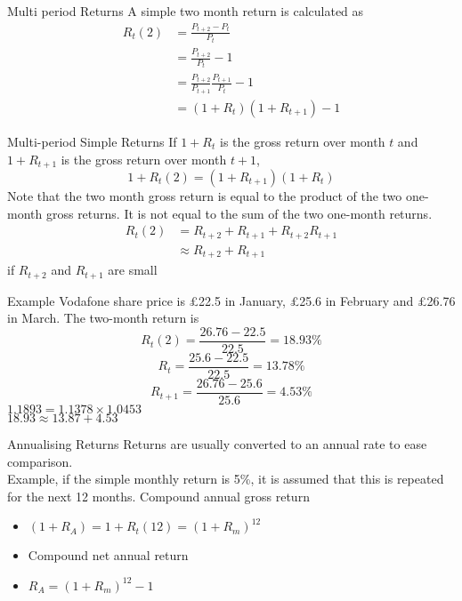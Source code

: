 \documentclass[14pt,xcolor=pdftex,dvipsnames,table]{beamer}
\begin{document}
\begin{frame}{Multi period Returns}
A simple two month return is calculated as 
\begin{align*}
R_t(2) & =\frac{P_{t+2}-P_t}{P_t}\\
&= \frac{P_{t+2}}{P_t} -1\\
& = \frac{P_{t+2}}{P_{t+1}}\frac{P_{t+1}}{P_t} -1\\
&= (1+R_t)(1+R_{t+1})-1
\end{align*}
\end{frame}

\begin{frame}{Multi-period Simple Returns}
If $1+R_t$ is the gross return over month $t$ and $1+R_{t+1}$ is the gross return over month $t+1$, 
\begin{equation}
1+R_t(2) = (1+R_{t+1})(1+R_t)
\end{equation}
Note that the two month gross return is equal to the product of the two one-month gross returns.  It is not equal to the sum of the two one-month returns. 
\begin{align*}
R_t(2) &= R_{t+2}+R_{t+1}+R_{t+2}R_{t+1}\\
& \approx R_{t+2}+R_{t+1}
\end{align*}
if $R_{t+2}$ and $R_{t+1}$ are small 
\end{frame}

\begin{frame}{Example}
Vodafone share price is £22.5 in January, £25.6 in February and £26.76 in March. The two-month return is 
\begin{equation}
R_t(2) = \frac{26.76-22.5}{22.5} = 18.93\%
\end{equation}
\begin{equation}
R_t=\frac{25.6-22.5}{22.5} = 13.78\%
\end{equation}
\begin{equation}
R_{t+1}=\frac{26.76-25.6}{25.6} = 4.53\%
\end{equation}
$1.1893 =1.1378 \times 1.0453$\\
$18.93  \approx 13.87 + 4.53$
\end{frame}

\begin{frame}{Annualising Returns}
Returns are usually converted to an annual rate to ease comparison. \\
Example, if the simple monthly return is 5\%, it is assumed that this is repeated for the next 12 months. 
Compound annual gross return \\
\begin{itemize}
\item $(1+R_A) = 1+R_t(12) = (1+R_m)^{12}$\\
\item Compound net annual return \\
\item $R_A = (1+R_m)^{12} - 1$
\end{itemize}
\end{frame}
\end{document}
